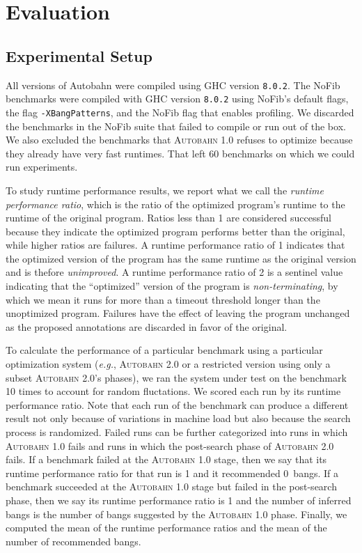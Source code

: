 \documentclass[format=sigplan, review=true]{acmart}
\newcommand{\SHOWCOMMENT}[1]{\ifdraft #1 \fi}
\newcommand{\ksf}[1]{\SHOWCOMMENT{{\color{tuftsblue} [K: #1]}}}
\newcommand{\eg}{\textit{e.g.}}
\newcommand{\Ao}[0]{\textsc{Autobahn 1.0}}
\newcommand{\At}[0]{\textsc{Autobahn 2.0}}
\newcommand{\postopt}[0]{post-search}
\newcommand{\nonterm}[0]{non-terminating}
\newcommand{\unimp}[0]{unimproved}
\begin{document}
\section{Evaluation}

\subsection{Experimental Setup}

All versions of Autobahn were compiled using GHC
version \texttt{8.0.2}. The NoFib benchmarks were compiled with
GHC version \texttt{8.0.2} using NoFib's default flags, the flag
\texttt{-XBangPatterns}, and the NoFib flag that enables profiling. 
We discarded the benchmarks in the NoFib suite that failed to compile
or run out of the box. We also excluded the benchmarks that \Ao{}
refuses to optimize because they already have very fast runtimes. That
left 60 benchmarks on which we could run experiments.

To study runtime performance results, we report what we call
the \textit{runtime performance ratio}, which is the ratio of the
optimized program's runtime to the runtime of the original program.
Ratios less than 1 are considered successful because they indicate the
optimized program performs better than the original, while higher
ratios are failures.  A runtime performance ratio of 1 indicates that
the optimized version of the program has the same runtime as the
original version and is thefore \textit{\unimp{}}.  A runtime
performance ratio of 2 is a sentinel value indicating that the
``optimized'' version of the program is \textit{\nonterm{}}, by which
we mean it runs for more than a timeout threshold longer than the
unoptimized program.  Failures have the effect of leaving the program
unchanged as the proposed annotations are discarded in favor of the
original.

To calculate the performance of a particular benchmark using a
particular optimization system (\eg{}, \At{} or a 
restricted version using only a subset \At's phases), we ran the system under test on the benchmark 10
times to account for random fluctations.
We scored each run by its runtime performance 
ratio. Note that each run of the benchmark can produce a different
result not only because of variations in machine load but also
because the search process is randomized.  Failed runs can be further
categorized into runs in which \Ao{} fails and runs in which
the \postopt{} phase of \At{}
fails. If a benchmark failed at the \Ao{} stage, then we say that its
runtime performance ratio for that run is 1 and it recommended
0~bangs. If a benchmark succeeded at the \Ao{} stage but failed
in the \postopt{} phase, then we say its runtime performance ratio is 1 and the
number of inferred bangs is the number of bangs suggested by the \Ao{}
phase. Finally, we computed the \ksf{harmonic} mean of the runtime
performance ratios and the \ksf{arithmetic} mean of the number of
recommended bangs.    
\end{document}
